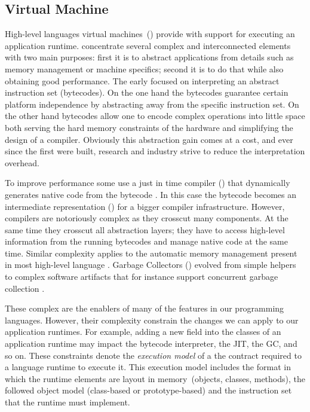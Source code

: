 \subsection{Virtual Machine}

High-level languages virtual machines~(\VMs) provide with support for executing an application runtime.
\VMs concentrate several complex and interconnected elements with two main purposes: first it is to abstract applications from details such as memory management or machine specifics; second it is to do that while also obtaining good performance.
The early \VMs focused on interpreting an abstract instruction set (bytecodes).
On the one hand the bytecodes guarantee certain platform independence by abstracting away from the \CPU specific instruction set.
On the other hand bytecodes allow one to encode complex operations into little space both serving the hard memory constraints of the hardware and simplifying the design of a compiler.
Obviously this abstraction gain comes at a cost, and ever since the first \VMs were built, research and industry strive to reduce the interpretation overhead.


To improve performance some \VMs use a just in time compiler (\JIT) that dynamically generates native code from the bytecode \cite{Deut84a}.
In this case the bytecode becomes an intermediate representation (\IR) for a bigger compiler infrastructure.
However, \JIT compilers are notoriously complex as they crosscut many \VM components.
At the same time they crosscut all abstraction layers; they have to access high-level information from the running bytecodes and manage native code at the same time.
Similar complexity applies to the automatic memory management present in most high-level language \VMs.
Garbage Collectors (\GC) evolved from simple helpers to complex software artifacts that for instance support concurrent garbage collection \cite{Clic05a}.

These complex \VMs are the enablers of many of the features in our programming languages. However, their complexity constrain the changes we can apply to our application runtimes. For example, adding a new field into the classes of an application runtime may impact the bytecode interpreter, the JIT, the GC, and so on. These constraints denote the \emph{execution model} of a \VM \ie the contract required to a language runtime to execute it. This execution model includes the format in which the runtime elements are layout in memory~(objects, classes, methods), the followed object model (\eg class-based or prototype-based) and the instruction set that the runtime must implement.

